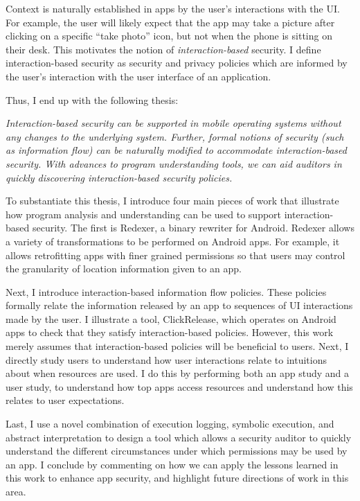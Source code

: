 Context is naturally established in apps by the user's interactions
with the UI. For example, the user will likely expect that the app may
take a picture after clicking on a specific ``take photo'' icon, but
not when the phone is sitting on their desk. This motivates the notion
of \emph{interaction-based} security. I define interaction-based
security as security and privacy policies which are informed by the
user's interaction with the user interface of an application.

Thus, I end up with the following thesis:

\textit{ \indent Interaction-based security can be supported in mobile
  operating systems without any changes to the underlying
  system. Further, formal notions of security (such as information
  flow) can be naturally modified to accommodate interaction-based
  security. With advances to program understanding tools, we can aid
  auditors in quickly discovering interaction-based security
  policies.}

To substantiate this thesis, I introduce four main pieces of work that
illustrate how program analysis and understanding can be used to
support interaction-based security. The first is Redexer, a binary
rewriter for Android. Redexer allows a variety of transformations to
be performed on Android apps. For example, it allows retrofitting apps
with finer grained permissions so that users may control the
granularity of location information given to an app.

Next, I introduce interaction-based information flow policies. These
policies formally relate the information released by an app to
sequences of UI interactions made by the user. I illustrate a tool,
ClickRelease, which operates on Android apps to check that they
satisfy interaction-based policies. However, this
work~\cite{micinski:15} merely assumes that interaction-based policies
will be beneficial to users. Next, I directly study users to
understand how user interactions relate to intuitions about when
resources are used. I do this by performing both an app study and a
user study, to understand how top apps access resources and understand
how this relates to user expectations.

Last, I use a novel combination of execution logging, symbolic
execution, and abstract interpretation to design a tool which allows a
security auditor to quickly understand the different circumstances
under which permissions may be used by an app. I conclude by
commenting on how we can apply the lessons learned in this work to
enhance app security, and highlight future directions of work in this
area.

